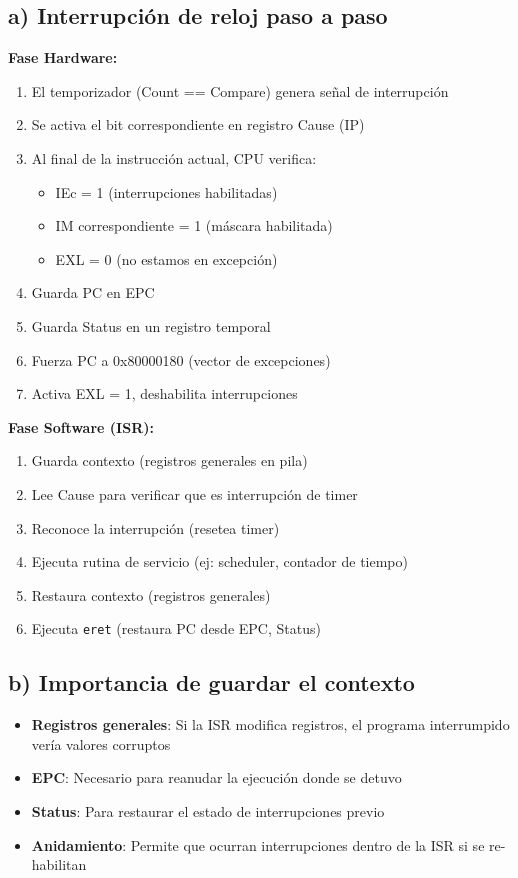 \documentclass[12pt,a4paper]{article}
\begin{document}
\subsection{a) Interrupción de reloj paso a paso}

\textbf{Fase Hardware:}
\begin{enumerate}
    \item El temporizador (Count == Compare) genera señal de interrupción
    \item Se activa el bit correspondiente en registro Cause (IP)
    \item Al final de la instrucción actual, CPU verifica:
    \begin{itemize}
        \item IEc = 1 (interrupciones habilitadas)
        \item IM correspondiente = 1 (máscara habilitada)
        \item EXL = 0 (no estamos en excepción)
    \end{itemize}
    \item Guarda PC en EPC
    \item Guarda Status en un registro temporal
    \item Fuerza PC a 0x80000180 (vector de excepciones)
    \item Activa EXL = 1, deshabilita interrupciones
\end{enumerate}

\textbf{Fase Software (ISR):}
\begin{enumerate}
    \item Guarda contexto (registros generales en pila)
    \item Lee Cause para verificar que es interrupción de timer
    \item Reconoce la interrupción (resetea timer)
    \item Ejecuta rutina de servicio (ej: scheduler, contador de tiempo)
    \item Restaura contexto (registros generales)
    \item Ejecuta \texttt{eret} (restaura PC desde EPC, Status)
\end{enumerate}

\subsection{b) Importancia de guardar el contexto}
\begin{itemize}
    \item \textbf{Registros generales}: Si la ISR modifica registros, el programa interrumpido vería valores corruptos
    \item \textbf{EPC}: Necesario para reanudar la ejecución donde se detuvo
    \item \textbf{Status}: Para restaurar el estado de interrupciones previo
    \item \textbf{Anidamiento}: Permite que ocurran interrupciones dentro de la ISR si se re-habilitan
\end{itemize}
\end{document}
